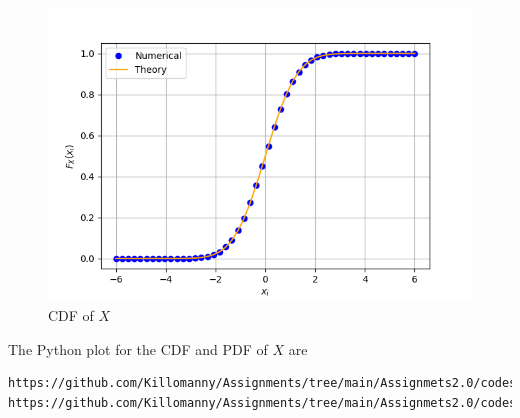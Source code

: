 \documentclass[journal,12pt,twocolumn]{IEEEtran}
\renewcommand\thesection{\arabic{section}}
\begin{document}
\begin{enumerate}[label=\thesection.\arabic*
,ref=\thesection.\theenumi]
\begin{figure}[h!]
    \includegraphics[width=\columnwidth]{./figs/2.2.png}
    \caption{CDF of $X$}
    \label{fig:my_label}
\end{figure}
\newpage
The Python plot for the CDF and PDF of $X$ are
\begin{lstlisting}
https://github.com/Killomanny/Assignments/tree/main/Assignmets2.0/codes/2.5_1.py
https://github.com/Killomanny/Assignments/tree/main/Assignmets2.0/codes/2.5_2.py
\end{lstlisting}
\end{enumerate}
\end{document}
